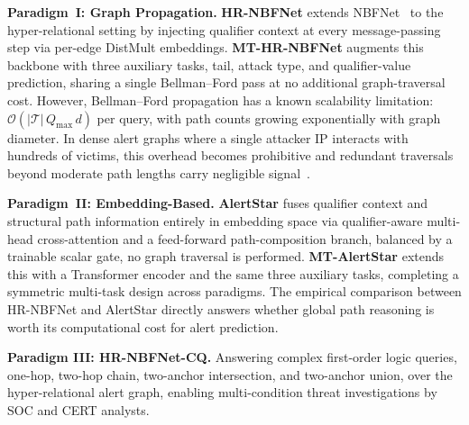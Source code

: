 \documentclass[10pt,journal,compsoc]{IEEEtran}
\begin{document}
\textbf{Paradigm~I: Graph Propagation.}
\textbf{HR-NBFNet} extends NBFNet~\cite{zhu2021neural}
to the hyper-relational setting by injecting
qualifier context at every message-passing step
via per-edge DistMult embeddings.
\textbf{MT-HR-NBFNet} augments this backbone with
three auxiliary tasks, tail, attack type, and
qualifier-value prediction, sharing a single
Bellman--Ford pass at no additional graph-traversal
cost. However, Bellman--Ford propagation has a
known scalability limitation:
$\mathcal{O}(|\mathcal{T}|\,Q_{\max}\,d)$ per
query, with path counts growing exponentially with
graph diameter. In dense alert graphs where a
single attacker IP interacts with hundreds of
victims, this overhead becomes prohibitive and
redundant traversals beyond moderate path lengths
carry negligible signal~\cite{zhu2021neural}.

\textbf{Paradigm~II: Embedding-Based.}
\textbf{AlertStar} fuses qualifier context and
structural path information entirely in embedding
space via qualifier-aware multi-head
cross-attention and a feed-forward
path-composition branch, balanced by a trainable
scalar gate, no graph traversal is performed.
\textbf{MT-AlertStar} extends this with a
Transformer encoder and the same three auxiliary
tasks, completing a symmetric multi-task design
across paradigms. The empirical comparison
between HR-NBFNet and AlertStar directly answers
whether global path reasoning is worth its
computational cost for alert prediction.

\textbf{Paradigm III: HR-NBFNet-CQ.} Answering
complex first-order logic queries, one-hop,
two-hop chain, two-anchor intersection, and two-anchor
union, over the hyper-relational alert graph,
enabling multi-condition threat investigations
by SOC and CERT analysts.
\end{document}
